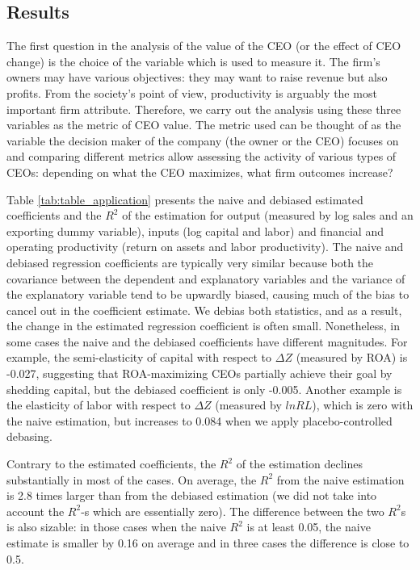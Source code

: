 \documentclass[11pt,a4paper]{article}
\begin{document}
\subsection{Results}

The first question in the analysis of the value of the CEO (or the effect of CEO change) is the choice of the variable which is used to measure it. The firm's owners may have various objectives: they may want to raise revenue but also profits. From the society's point of view, productivity is arguably the most important firm attribute. Therefore, we carry out the analysis using these three variables as the metric of CEO value. The metric used can be thought of as the variable the decision maker of the company (the owner or the CEO) focuses on and comparing different metrics allow assessing the activity of various types of CEOs: depending on what the CEO maximizes, what firm outcomes increase?

Table \ref{tab:table_application} presents the naive and debiased estimated coefficients and the $R^2$ of the estimation for output (measured by log sales and an exporting dummy variable), inputs (log capital and labor) and financial and operating productivity (return on assets and labor productivity). The naive and debiased regression coefficients are typically very similar because both the covariance between the dependent and explanatory variables and the variance of the explanatory variable tend to be upwardly biased, causing much of the bias to cancel out in the coefficient estimate. We debias both statistics, and as a result, the change in the estimated regression coefficient is often small. Nonetheless, in some cases the naive and the debiased coefficients have different magnitudes. For example, the semi-elasticity of capital with respect to $\Delta Z$ (measured by ROA) is -0.027, suggesting that ROA-maximizing CEOs partially achieve their goal by shedding capital, but the debiased coefficient is only -0.005. Another example is the elasticity of labor with respect to $\Delta Z$ (measured by $lnRL$), which is zero with the naive estimation, but increases to 0.084 when we apply placebo-controlled debasing.

Contrary to the estimated coefficients, the $R^2$ of the estimation declines substantially in most of the cases. On average, the $R^2$ from the naive estimation is 2.8 times larger than from the debiased estimation (we did not take into account the $R^2$-s which are essentially zero). The difference between the two $R^2$s is also sizable: in those cases when the naive $R^2$ is at least 0.05, the naive estimate is smaller by 0.16 on average and in three cases the difference is close to 0.5.
\end{document}
